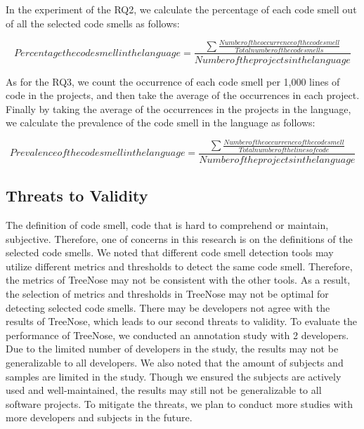 In the experiment of the RQ2, we calculate the percentage of each code smell out of all the selected code smells as follows:

\begin{equation}
    Percentage the code smell in the language = \frac{\sum{\frac{Number of the occurrence of the code smell}{Total number of the code smells}}}{Number of the projects in the language}
\end{equation}

As for the RQ3, 
we count the occurrence of each code smell per 1,000 lines of code in the projects,
and then take the average of the occurrences in each project. Finally by taking the average of the occurrences in the projects in the language, 
we calculate the prevalence of the code smell in the language as follows:

\begin{equation}
    Prevalence of the code smell in the language = \frac{\sum{\frac{Number of the occurrence of the code smell}{Total number of the lines of code}}}{Number of the projects in the language}
\end{equation}
\subsection{Threats to Validity}
\label{sec:threats-to-validity}

The definition of code smell, code that is hard to comprehend or maintain, subjective. Therefore, one of concerns in this research is on the
definitions of the selected code smells. We noted that different code smell detection tools may utilize 
different metrics and thresholds to detect the same code smell. Therefore, the metrics of TreeNose may not be consistent with the other tools.
As a result, the selection of metrics and thresholds in TreeNose may not be optimal for detecting selected code smells.
There may be developers not agree with the results of TreeNose, which leads to our second threats to validity. To evaluate the performance of TreeNose,
we conducted an annotation study with 2 developers. Due to the limited number of developers in the study, the results may not be 
generalizable to all developers. We also noted that the amount of subjects and samples are limited in the study. Though we ensured the subjects are actively used and well-maintained, 
the results may still not be generalizable to all software projects. 
To mitigate the threats, we plan to conduct more studies with more developers and subjects in the future.
